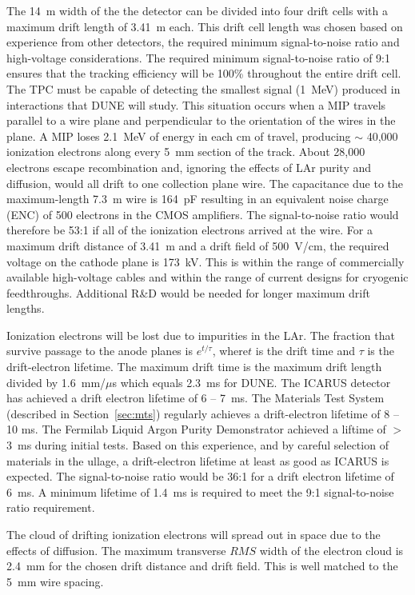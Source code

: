 The 14~m width of the the detector can be divided into four drift
cells with a maximum drift length of 3.41~m each. This drift cell
length was chosen based on experience from other detectors, the
required minimum signal-to-noise ratio and high-voltage
considerations. The required minimum signal-to-noise ratio of 9:1
ensures that the tracking efficiency will be 100\% throughout the
entire drift cell. The TPC must be capable of detecting the smallest
signal (1~MeV) produced in interactions that DUNE will study. This
situation occurs when a MIP travels parallel to a wire plane and
perpendicular to the orientation of the wires in the plane. A MIP
loses 2.1~MeV of energy in each cm of travel, producing $\sim$ 40,000
ionization electrons along every 5~mm section of the track. About
28,000 electrons escape recombination and, ignoring the effects of LAr
purity and diffusion, would all drift to one collection plane
wire. The capacitance due to the maximum-length 7.3~m wire is 164~pF
resulting in an equivalent noise charge (ENC) of 500 electrons in the
CMOS amplifiers. The signal-to-noise ratio would therefore be 53:1 if
all of the ionization electrons arrived at the wire. For a maximum
drift distance of 3.41~m and a drift field of 500~V/cm, the required
voltage on the cathode plane is 173~kV. This is within the range of
commercially available high-voltage cables and within the range of
current designs for cryogenic feedthroughs. Additional R\&D would be
needed for longer maximum drift lengths.

Ionization electrons will be lost due to impurities in the LAr. The
fraction that survive passage to the anode planes is $e^{t/\tau}$,
where$t$ is the drift time and $\tau$ is the drift-electron
lifetime. The maximum drift time is the maximum drift length divided
by 1.6~mm/$\mu$s which equals 2.3~ms for DUNE. The ICARUS detector has
achieved a drift electron lifetime of 6 -- 7~ms. The Materials Test
System (described in Section~\ref{sec:mts}) regularly achieves a
drift-electron lifetime of 8 -- 10 ms. The Fermilab Liquid Argon
Purity Demonstrator achieved a liftime of $>$ 3~ms during initial
tests. Based on this experience, and by careful selection of materials
in the ullage, a drift-electron lifetime at least as good as ICARUS is
expected. The signal-to-noise ratio would be 36:1 for a drift electron
lifetime of 6~ms. A minimum lifetime of 1.4~ms is required to meet the
9:1 signal-to-noise ratio requirement.

The cloud of drifting ionization electrons will spread out in space
due to the effects of diffusion. The maximum transverse $RMS$ width of
the electron cloud is 2.4~mm for the chosen drift distance and drift
field. This is well matched to the 5~mm wire spacing.


